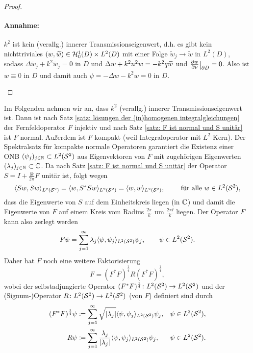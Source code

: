 \begin{proof}
\begin{enumerate}[label=(\alph*)]
		\paragraph{Annahme:} \(k^2\) ist kein (verallg.) innerer Transmissionseigenwert, d.h. es gibt kein nichttriviales \((w,\widetilde{w})\in\mathcal{H}_0^1(D)\times L^2(D)\) mit einer Folge \(\widetilde{w}_j\to\widetilde{w}\) in \(L^2(D)\), sodass \(\Delta\widetilde{w}_j+k^2\widetilde{w}_j=0\) in \(D\) und \(\Delta w+k^2n^2w=-k^2q\widetilde{w}\) und \(\frac{\p w}{\p\normal}\restrict{\p D}=0\). Also ist \(w\equiv0\) in \(D\) und damit auch \(\psi=-\Delta w-k^2w=0\) in \(D\).
	\end{enumerate}
\end{proof}
Im Folgenden nehmen wir an, dass \(k^2\)  (verallg.) innerer Transmissionseigenwert ist. Dann ist nach Satz \ref{satz: lösungen der (in)homogenen integralgleichungen} der Fernfeldoperator \(F\) injektiv und nach Satz \ref{satz: F ist normal und S unitär} ist \(F\) normal. Außerdem ist \(F\) kompakt (weil Integraloperator mit \(L^2\)-Kern). Der Spektralsatz für kompakte normale Operatoren garantiert die Existenz einer ONB \((\psi_j)_{j\in\mathbb{N}}\subset L^2(\mathcal{S}^2)\) aus Eigenvektoren von \(F\) mit zugehörigen Eigenwerten \((\lambda_j)_{j\in\mathbb{N}}\subset\mathbb{C}\). Da nach Satz \ref{satz: F ist normal und S unitär} der Operator \(S=I+\frac{\ii k}{2\pi}F\) unitär ist, folgt wegen
\begin{equation*}
	\langle Sw, Sw\rangle_{L^2(\mathcal{S}^2)}=\langle w, S^\ast Sw\rangle_{L^2(\mathcal{S}^2)}=\langle w, w\rangle_{L^2(\mathcal{S}^2)},\qquad\text{ für alle }w\in L^2(\mathcal{S}^2),
\end{equation*}
dass die Eigenwerte von \(S\) auf dem Einheitskreis liegen (in \(\mathbb{C}\)) und damit die Eigenwerte von \(F\) auf einem Kreis vom Radius \(\frac{2\pi}{k}\) um \(\frac{2\pi\ii}{k}\) liegen. Der Operator \(F\) kann also zerlegt werden
\begin{equation}
	\label{zerlegung operator F mit spektralsatz}
	F\psi=\sum_{j=1}^\infty\lambda_j\langle \psi, \psi_j\rangle_{L^2(\mathcal{S}^2)}\psi_j,\qquad\psi\in L^2(\mathcal{S}^2).
\end{equation}
Daher hat \(F\) noch eine weitere Faktorisierung
\begin{equation}
	\label{weitere zerlegung von F}
	F=(F^\ast F)^\frac{1}{4}R(F^\ast F)^{\frac{1}{4}},
\end{equation}
wobei der selbstadjungierte Operator \((F^\ast F)^\frac{1}{4}\colon L^2(\mathcal{S}^2) \to L^2(\mathcal{S}^2)\) und der (Signum-)Operator \(R\colon L^2(\mathcal{S}^2) \to L^2(\mathcal{S}^2)\) (von \(F\)) definiert sind durch
\begin{align}
	\label{definition (F*F)^0.25}
	(F^\ast F)^\frac{1}{4}\psi & \coloneqq\sum_{j=1}^\infty\sqrt{|\lambda_j|}\langle \psi, \psi_j\rangle_{L^2(\mathcal{S}^2)}\psi_j, & \psi\in L^2(\mathcal{S}^2),\\
	\label{definition R}
	R\psi & \coloneqq\sum_{j=1}^\infty\frac{\lambda_j}{|\lambda_j|}\langle \psi, \psi_j\rangle_{L^2(\mathcal{S}^2)}\psi_j, & \psi\in L^2(\mathcal{S}^2).
\end{align}
